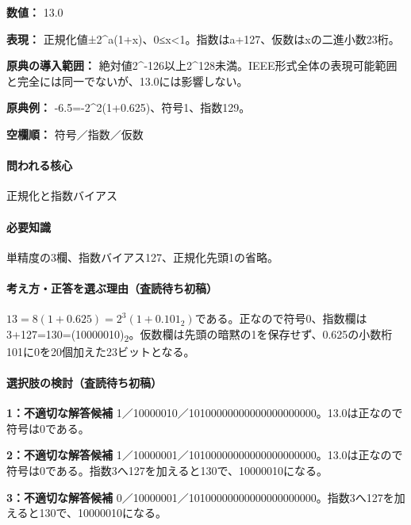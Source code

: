 \noindent\textbf{数値：} 13.0\par

\noindent\textbf{表現：} 正規化値±2\textasciicircum{}a(1+x)、0≤x<1。指数はa+127、仮数はxの二進小数23桁。\par

\noindent\textbf{原典の導入範囲：} 絶対値2\textasciicircum{}-126以上2\textasciicircum{}128未満。IEEE形式全体の表現可能範囲と完全には同一でないが、13.0には影響しない。\par

\noindent\textbf{原典例：} -6.5=-2\textasciicircum{}2(1+0.625)、符号1、指数129。\par

\noindent\textbf{空欄順：} 符号／指数／仮数\par

\paragraph{問われる核心} 正規化と指数バイアス

\paragraph{必要知識} 単精度の3欄、指数バイアス127、正規化先頭1の省略。

\paragraph{考え方・正答を選ぶ理由（査読待ち初稿）} \(13=8(1+0.625)=2^3(1+0.101_2)\)である。正なので符号0、指数欄は3+127=\allowbreak{}130=\allowbreak{}(10000010)\textsubscript{2}。仮数欄は先頭の暗黙の1を保存せず、0.625の小数桁101に0を20個加えた23ビットとなる。

\paragraph{選択肢の検討（査読待ち初稿）}\mbox{}\par

\noindent\textbf{1：不適切な解答候補} 1／10000010／10100000000000000000000。13.0は正なので符号は0である。\par

\noindent\textbf{2：不適切な解答候補} 1／10000001／10100000000000000000000。13.0は正なので符号は0である。指数3へ127を加えると130で、10000010になる。\par

\noindent\textbf{3：不適切な解答候補} 0／10000001／10100000000000000000000。指数3へ127を加えると130で、10000010になる。\par

